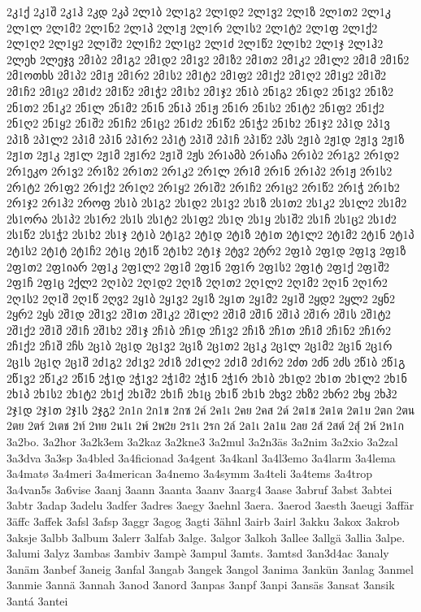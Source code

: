 2კ1ქ
2კ1შ
2კ1ჰ
2კდ
2კპ
2ლ1ბ
2ლ1გ2
2ლ1დ2
2ლ1ვ2
2ლ1ზ
2ლ1თ2
2ლ1კ
2ლ1ლ
2ლ1მ2
2ლ1ნ2
2ლ1პ
2ლ1ჟ
2ლ1რ
2ლ1ს2
2ლ1ტ2
2ლ1ფ
2ლ1ქ2
2ლ1ღ2
2ლ1ყ2
2ლ1შ2
2ლ1ჩ2
2ლ1ც2
2ლ1ძ
2ლ1წ2
2ლ1ხ2
2ლ1ჯ
2ლ1ჰ2
2ლეხ
2ლეჯვ
2მ1ბ2
2მ1გ2
2მ1დ2
2მ1ვ2
2მ1ზ2
2მ1თ2
2მ1კ2
2მ1ლ2
2მ1მ
2მ1ნ2
2მ1ოთხს
2მ1პ2
2მ1ჟ
2მ1რ2
2მ1ს2
2მ1ტ2
2მ1ფ2
2მ1ქ2
2მ1ღ2
2მ1ყ2
2მ1შ2
2მ1ჩ2
2მ1ც2
2მ1ძ2
2მ1წ2
2მ1ჭ2
2მ1ხ2
2მ1ჯ2
2ნ1ბ
2ნ1გ2
2ნ1დ2
2ნ1ვ2
2ნ1ზ2
2ნ1თ2
2ნ1კ2
2ნ1ლ
2ნ1მ2
2ნ1ნ
2ნ1პ
2ნ1ჟ
2ნ1რ
2ნ1ს2
2ნ1ტ2
2ნ1ფ2
2ნ1ქ2
2ნ1ღ2
2ნ1ყ2
2ნ1შ2
2ნ1ჩ2
2ნ1ც2
2ნ1ძ2
2ნ1წ2
2ნ1ჭ2
2ნ1ხ2
2ნ1ჯ2
2პ1დ
2პ1ვ
2პ1ზ
2პ1ლ2
2პ1მ
2პ1ნ
2პ1რ2
2პ1ტ
2პ1შ
2პ1ჩ
2პ1წ2
2პს
2ჟ1ბ
2ჟ1დ
2ჟ1ვ
2ჟ1ზ
2ჟ1თ
2ჟ1კ
2ჟ1ლ
2ჟ1მ
2ჟ1რ2
2ჟ1შ
2ჟს
2რ1ამბ
2რ1აჩა
2რ1ბ2
2რ1გ2
2რ1დ2
2რ1ეკო
2რ1ვ2
2რ1ზ2
2რ1თ2
2რ1კ2
2რ1ლ
2რ1მ
2რ1ნ
2რ1პ2
2რ1ჟ
2რ1ს2
2რ1ტ2
2რ1ფ2
2რ1ქ2
2რ1ღ2
2რ1ყ2
2რ1შ2
2რ1ჩ2
2რ1ც2
2რ1წ2
2რ1ჭ
2რ1ხ2
2რ1ჯ2
2რ1ჰ2
2როფ
2ს1ბ
2ს1გ2
2ს1დ2
2ს1ვ2
2ს1ზ
2ს1თ2
2ს1კ2
2ს1ლ2
2ს1მ2
2ს1ორა
2ს1პ2
2ს1რ2
2ს1ს
2ს1ტ2
2ს1ფ2
2ს1ღ
2ს1ყ
2ს1შ2
2ს1ჩ
2ს1ც2
2ს1ძ2
2ს1წ2
2ს1ჭ2
2ს1ხ2
2ს1ჯ
2ტ1ბ
2ტ1გ2
2ტ1დ
2ტ1ზ
2ტ1თ
2ტ1ლ2
2ტ1მ2
2ტ1ნ
2ტ1პ
2ტ1ს2
2ტ1ტ
2ტ1ჩ2
2ტ1ც
2ტ1წ
2ტ1ხ2
2ტ1ჯ
2ტვ2
2ტრ2
2ფ1ბ
2ფ1დ
2ფ1ვ
2ფ1ზ
2ფ1თ2
2ფ1იარ
2ფ1კ
2ფ1ლ2
2ფ1მ
2ფ1ნ
2ფ1რ
2ფ1ს2
2ფ1ტ
2ფ1ქ
2ფ1შ2
2ფ1ჩ
2ფ1ც
2ქლ2
2ღ1ბ2
2ღ1დ2
2ღ1ზ
2ღ1თ2
2ღ1ლ2
2ღ1მ2
2ღ1ნ
2ღ1რ2
2ღ1ს2
2ღ1შ
2ღ1წ
2ღვ2
2ყ1ბ
2ყ1ვ2
2ყ1ზ
2ყ1თ
2ყ1მ2
2ყ1შ
2ყდ2
2ყლ2
2ყნ2
2ყრ2
2ყს
2შ1დ
2შ1ვ2
2შ1თ
2შ1კ2
2შ1ლ2
2შ1მ
2შ1ნ
2შ1პ
2შ1რ
2შ1ს
2შ1ტ2
2შ1ქ2
2შ1შ
2შ1ჩ
2შ1ხ2
2შ1ჯ
2ჩ1ბ
2ჩ1დ
2ჩ1ვ2
2ჩ1ზ
2ჩ1თ
2ჩ1მ
2ჩ1ნ2
2ჩ1რ2
2ჩ1ქ2
2ჩ1შ
2ჩს
2ც1ბ
2ც1დ
2ც1ვ2
2ც1ზ
2ც1თ2
2ც1კ
2ც1ლ
2ც1მ2
2ც1ნ
2ც1რ
2ც1ს
2ც1ღ
2ც1შ
2ძ1გ2
2ძ1ვ2
2ძ1ზ
2ძ1ლ2
2ძ1მ
2ძ1რ2
2ძთ
2ძნ
2ძს
2წ1ბ
2წ1გ
2წ1ვ2
2წ1კ2
2წ1ნ
2ჭ1დ
2ჭ1ვ2
2ჭ1მ2
2ჭ1ნ
2ჭ1რ
2ხ1ბ
2ხ1დ2
2ხ1თ
2ხ1ლ2
2ხ1ნ
2ხ1პ
2ხ1ს2
2ხ1ტ2
2ხ1ქ
2ხ1შ2
2ხ1ჩ
2ხ1ც
2ხ1წ
2ხ1ხ
2ხვ2
2ხზ2
2ხრ2
2ხყ
2ხჰ2
2ჯ1დ
2ჯ1თ
2ჯ1ს
2ჯგ2
2ก1ก
2ก1ข
2กซ
2ค์
2ค1เ
2คย
2คส
2ด์
2ต1ช
2ต1ต
2ต1บ
2ตก
2ตน
2ตย
2ตร์
2เตช
2ท์
2ทย
2น1เ
2พ์
2พ2ย
2ร1เ
2รก
2ล์
2ล1เ
2ล1แ
2ลย
2ส์
2สต์
2สุ์
2ห์
2ห1ก
3a2bo.
3a2hor
3a2k3em
3a2kaz
3a2kne3
3a2mul
3a2n3äs
3a2nim
3a2xio
3a2zal
3a3dva
3a3sp
3a4bled
3a4ficionad
3a4gent
3a4kanl
3a4l3emo
3a4larm
3a4lema
3a4matø
3a4meri
3a4merican
3a4nemo
3a4symm
3a4teli
3a4tems
3a4trop
3a4van5s
3a6vise
3aanj
3aann
3aanta
3aanv
3aarg4
3aase
3abruf
3abst
3abtei
3abtr
3adap
3adelu
3adfer
3adres
3aegy
3aehnl
3aera.
3aerod
3aesth
3aeugi
3affär
3äffc
3affek
3afsl
3afsp
3aggr
3agog
3agti
3ähnl
3airb
3airl
3akku
3akox
3akrob
3aksje
3albb
3album
3alerr
3alfab
3alge.
3algor
3alkoh
3allee
3allgä
3allia
3alpe.
3alumi
3alyz
3ambas
3ambiv
3ampè
3ampul
3amts.
3amtsd
3an3d4ac
3analy
3anäm
3anbef
3aneig
3anfal
3angab
3angek
3angol
3anima
3ankün
3anlag
3anmel
3anmie
3annä
3annah
3anod
3anord
3anpas
3anpf
3anpi
3ansäs
3ansat
3ansik
3antá
3antei
